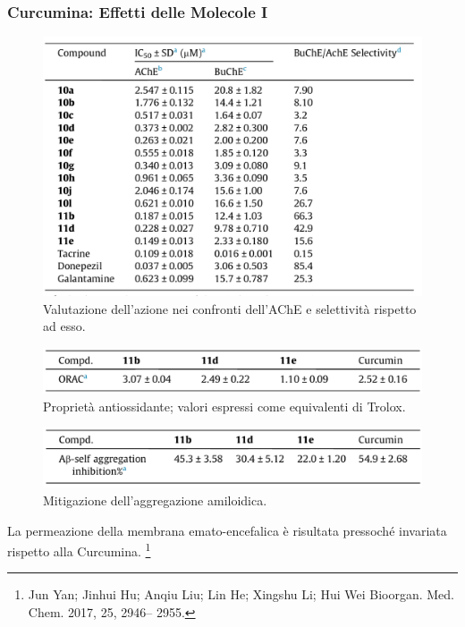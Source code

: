 \documentclass[9pt]{beamer}
\newcommand\blfootnote[1]{%
	\begingroup
	\renewcommand\thefootnote{}\footnote{#1}%
	\addtocounter{footnote}{-1}%
	\endgroup
}
\begin{document}
\begin{frame}
	\frametitle{Curcumina: Effetti delle Molecole I}
	
	\begin{figure}
		\includegraphics[scale=0.6]{immagini/tabellacomposti_curcdone.png}
		{\caption*{\footnotesize{Valutazione dell’azione nei confronti dell’AChE e selettività rispetto ad esso.}}}
	\end{figure}
	
	\begin{figure}
		\includegraphics[scale=0.6]{immagini/roi_curcdone.png}
		{\caption*{\footnotesize{Proprietà antiossidante; valori espressi come equivalenti di Trolox.}}}
	\end{figure}
	
	\begin{figure}
		\includegraphics[scale=0.6]{immagini/selfab_curcdone.png}
		{\caption*{\footnotesize{Mitigazione dell'aggregazione amiloidica.}}}
	\end{figure}
	
	\small{ La permeazione della membrana emato-encefalica è risultata pressoché invariata rispetto alla Curcumina.} \medskip
	\blfootnote{Jun Yan; Jinhui Hu; Anqiu Liu; Lin He; Xingshu Li; Hui Wei Bioorgan. Med. Chem. 2017, 25, 2946–
		2955.}
\end{frame}
\end{document}
